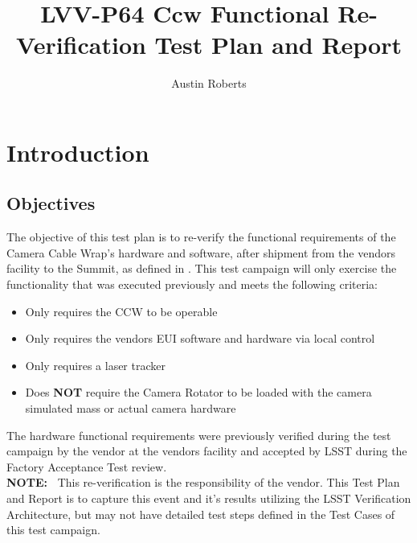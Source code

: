 \documentclass[SE,lsstdraft,STR,toc]{lsstdoc}
\providecommand{\tightlist}{
  \setlength{\itemsep}{0pt}\setlength{\parskip}{0pt}}
\begin{document}
\def\milestoneName{Ccw Functional Re-Verification}
\def\milestoneId{LVV-P64}
\def\product{SIT-COM Integration}


\title{ LVV-P64 Ccw Functional Re-Verification Test Plan and Report}
\setDocRef{\lsstDocType-\lsstDocNum}
\date{\vcsdate}
\author{ Austin Roberts }






\maketitle

\section{Introduction}
\label{sect:intro}


\subsection{Objectives}
\label{sect:objectives}

 The objective of this test plan is to re-verify the functional
requirements of the Camera Cable Wrap's hardware and software, after
shipment from the vendors facility to the Summit, as defined in .
This test campaign will only exercise the functionality that was
executed previously and meets the following criteria:

\begin{itemize}
\tightlist
\item
  Only requires the CCW to be operable
\item
  Only requires the vendors EUI software and hardware via local control
\item
  Only requires a laser tracker
\item
  Does \textbf{NOT} require the Camera Rotator to be loaded with the
  camera simulated mass or actual camera hardware
\end{itemize}

The hardware functional requirements were previously verified during the
test campaign by the vendor at the vendors facility and accepted by LSST
during the Factory Acceptance Test
review.\\[2\baselineskip]\textbf{NOTE:~} This re-verification is the
responsibility of the vendor. This Test Plan and Report is to capture
this event and it's results utilizing the LSST Verification
Architecture, but may not have detailed test steps defined in the Test
Cases of this test campaign.
\end{document}
